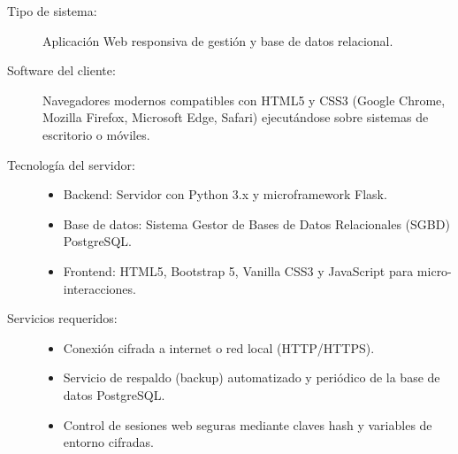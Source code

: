 \begin{description}
	\item[Tipo de sistema:] Aplicación Web responsiva de gestión y base de datos relacional.
	\item[Software del cliente:] Navegadores modernos compatibles con HTML5 y CSS3 (Google Chrome, Mozilla Firefox, Microsoft Edge, Safari) ejecutándose sobre sistemas de escritorio o móviles.
	\item[Tecnología del servidor:] 
	\begin{itemize}
		\item Backend: Servidor con Python 3.x y microframework Flask.
		\item Base de datos: Sistema Gestor de Bases de Datos Relacionales (SGBD) PostgreSQL.
		\item Frontend: HTML5, Bootstrap 5, Vanilla CSS3 y JavaScript para micro-interacciones.
	\end{itemize}
	\item[Servicios requeridos:]
	\begin{itemize}
		\item Conexión cifrada a internet o red local (HTTP/HTTPS).
		\item Servicio de respaldo (backup) automatizado y periódico de la base de datos PostgreSQL.
		\item Control de sesiones web seguras mediante claves hash y variables de entorno cifradas.
	\end{itemize}
\end{description}

